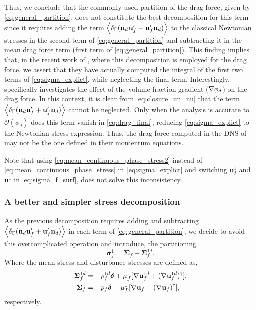 Thus, we conclude that the commonly used partition of the drag force, given by \ref{eq:general_partition}, does not constitute the best decomposition for this term since it requires adding the term  $\left<\delta_\Gamma (\textbf{n}_d \textbf{u}_f'+  \textbf{u}_f' \textbf{n}_d)\right>$ to the classical Newtonian stresses in the second term of \ref{eq:general_partition} and subtracting it in the mean drag force term (first term of \ref{eq:general_partition}). 
This finding implies that, in the recent work of \citet{wang2021numerical, wang2024effect}, where this decomposition is employed for the drag force, we assert that they have actually computed the integral of the first two terms of \ref{eq:sigma_explict}, while neglecting the final term. 
Interestingly, \citet{wang2024effect} specifically investigates the effect of the volume fraction gradient ($\mathbf{\nabla} \phi_d$) on the drag force. 
In this context, it is clear from \eqref{eq:closure_un_nu} that the term $\left<\delta_\Gamma (\textbf{n}_d \textbf{u}_f'+  \textbf{u}_f' \textbf{n}_d)\right>$ cannot be neglected. 
Only when the analysis is accurate to $\mathcal{O}(\phi_d)$ does this term vanish in \ref{eq:drag_final}, reducing \ref{eq:sigma_explict} to the Newtonian stress expression. 
Thus, the drag force computed in the DNS of \citet{wang2024effect} may not be the one defined in their momentum equations. 

Note that using \ref{eq:mean_continuous_phase_stress2} instead of \ref{eq:mean_continuous_phase_stress} in \ref{eq:sigma_explict} and switching $\textbf{u}_f^1$ and $\textbf{u}^1$ in \ref{eq:sigma_f_surf}, does not solve this inconsistency. 

\subsubsection{A better and simpler stress decomposition}

As the previous decomposition requires adding and subtracting $\left<\delta_\Gamma (\textbf{n}_d \textbf{u}_f'+  \textbf{u}_f' \textbf{n}_d)\right>$ in each term of \ref{eq:general_partition}, we decide to avoid this overcomplicated operation and introduce, the partitioning 
\begin{equation}
    \bm\sigma_f^1 =
    \bm\Sigma_f + 
    \bm\Sigma_f^{1d}. 
    \label{eq:mean_Newtonian}
\end{equation}
Where the mean stress and disturbance stresses are defined as, 
\begin{align}
    \bm\Sigma_f^{1d}
    &=-p_f^{1d}\bm\delta + \mu_f^1 [\mathbf{\nabla} \textbf{u}^{1d}_f + (\mathbf{\nabla} \textbf{u}^{1d}_f)^\dagger], \\
    \bm\Sigma_f
    &=-p_f\bm\delta + \mu_f^1 [\mathbf{\nabla} \textbf{u}_f + (\mathbf{\nabla} \textbf{u}_f)^\dagger], 
\end{align}
respectively. 

